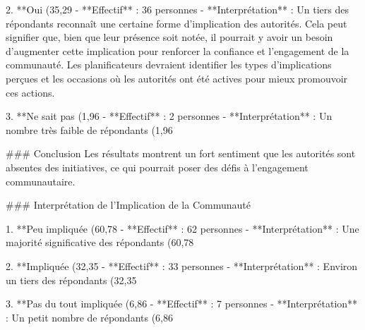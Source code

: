 2. **Oui (35,29%
   - **Effectif** : 36 personnes
   - **Interprétation** : Un tiers des répondants reconnaît une certaine forme d'implication des autorités. Cela peut signifier que, bien que leur présence soit notée, il pourrait y avoir un besoin d'augmenter cette implication pour renforcer la confiance et l'engagement de la communauté. Les planificateurs devraient identifier les types d'implications perçues et les occasions où les autorités ont été actives pour mieux promouvoir ces actions.

3. **Ne sait pas (1,96%
   - **Effectif** : 2 personnes
   - **Interprétation** : Un nombre très faible de répondants (1,96%

### Conclusion
Les résultats montrent un fort sentiment que les autorités sont absentes des initiatives, ce qui pourrait poser des défis à l'engagement communautaire. 

### Interprétation de l'Implication de la Communauté

1. **Peu impliquée (60,78%
   - **Effectif** : 62 personnes
   - **Interprétation** : Une majorité significative des répondants (60,78%

2. **Impliquée (32,35%
   - **Effectif** : 33 personnes
   - **Interprétation** : Environ un tiers des répondants (32,35%

3. **Pas du tout impliquée (6,86%
   - **Effectif** : 7 personnes
   - **Interprétation** : Un petit nombre de répondants (6,86%

